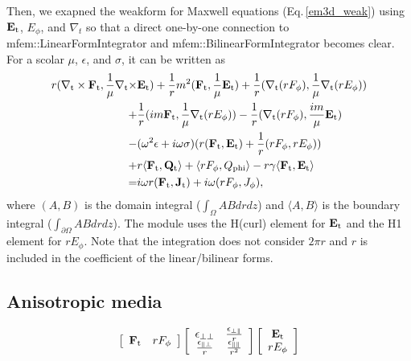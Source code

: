 \documentclass[11pt,a4paper,draft]{report}
\begin{document}
Then, we exapned the weakform for Maxwell equations (Eq.\,\ref{em3d_weak}) using $\mathbf{E}_{\rm t}$, $E_{\phi}$, and $\nabla_{t}$ so that a direct one-by-one connection to mfem::LinearFormIntegrator and mfem::BilinearFormIntegrator becomes clear.
For a scolar $\mu$, $\epsilon$, and $\sigma$, it can be written as 
 \begin{align}
r(\nabla_{\rm t} \times \mathbf{F}_{\rm t},  \frac{1}{\mu}\nabla_{\rm t}  \times & \mathbf{E}_{\rm t}) 
+\frac{1}{r} m^2(\mathbf{F}_{\rm t}, \frac{1}{\mu}\mathbf{E}_{\rm t})
+ \frac{1}{r} (\nabla_{\rm t} (rF_{\rm \phi}), \frac{1}{\mu}\nabla_{\rm t} (rE_{\rm \phi}))
 \notag \\
+& \frac{1}{r} (im \mathbf{F}_{\rm t}, \frac{1}{\mu}\nabla_{\rm t} (rE_{\rm \phi}))
- \frac{1}{r} (\nabla_{\rm t} (rF_{\rm \phi}), \frac{im}{\mu} \mathbf{E}_{\rm t})
 \notag \\
 -& (\omega^2 \epsilon+ i \omega \sigma) ( r( \mathbf{F}_{\rm t}, \mathbf{E}_{\rm t}) + \frac{1}{r}(rF_{\rm \phi}, rE_{\rm \phi})) 
 \notag \\
 +& r \langle \mathbf{F}_{\rm t},  \mathbf{Q}_{\rm t} \rangle + \langle rF_{\rm \phi}, Q_{\rm phi} \rangle -r \gamma \langle \mathbf{F}_{\rm t}, \mathbf{E}_{\rm t} \rangle
 \notag \\
 =& i \omega r ( \mathbf{F}_{\rm t}, \mathbf{J}_{\rm t} ) + i \omega ( rF_{\rm \phi}, J_{\rm \phi} ), \label{em2da_weak}
 \end{align}
 where $(A , B)$ is the domain integral ($\int_{\Omega} AB drdz$) and $\langle A, B \rangle $ is the boundary integral ($\int_{\partial \Omega} ABdrdz$). The module uses the H(curl) element for $\mathbf{E}_{\rm t}$ and the H1 element for $rE_{\phi}$. Note that the integration does not consider $2 \pi r$ and $r$ is included in the coefficient of the linear/bilinear forms. 
 
 \subsection{Anisotropic media}
 

 \begin{equation}
 \left[ {\begin{array}{*{20}c}
\mathbf{F}_{\rm t}  & rF_{\rm \phi}\\
\end{array}}\right]
\left[ {\begin{array}{*{20}c}
\mathbf{\epsilon}_{\perp \perp}  & \frac{\mathbf{\epsilon}_{\perp \parallel}}{r}\\
\frac{\mathbf{\epsilon}_{\parallel \perp}}{r} & \frac{\mathbf{\epsilon}_{\parallel \parallel}}{r^2}\\
\end{array}}\right]
 \left[ {\begin{array}{*{20}c}
\mathbf{E}_{\rm t}  \\
rE_{\rm \phi}\\
\end{array}}\right]
\label{response_matrix_eq}
\end{equation}
\end{document}
